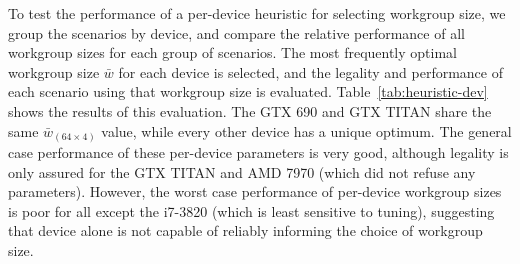 \documentclass[nonatbib,preprint,9pt]{sigplanconf}
\begin{document}
To test the performance of a per-device heuristic for selecting
workgroup size, we group the scenarios by device, and compare the
relative performance of all workgroup sizes for each group of
scenarios. The most frequently optimal workgroup size $\bar{w}$ for
each device is selected, and the legality and performance of each
scenario using that workgroup size is evaluated.
Table~\ref{tab:heuristic-dev} shows the results of this evaluation.
The GTX 690 and GTX TITAN share the same $\bar{w}_{(64 \times 4)}$
value, while every other device has a unique optimum. The general case
performance of these per-device parameters is very good, although
legality is only assured for the GTX TITAN and AMD 7970 (which did not
refuse any parameters). However, the worst case performance of
per-device workgroup sizes is poor for all except the i7-3820 (which
is least sensitive to tuning), suggesting that device alone is not
capable of reliably informing the choice of workgroup size.
\end{document}
